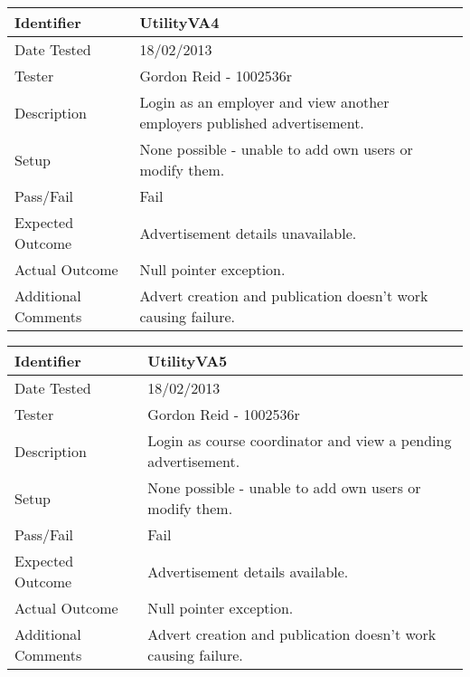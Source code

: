 \vspace{2em}

\begin{tabularx}{\textwidth}{|T|L|}
\hline
Identifier & UtilityVA4\\
\hline
Date Tested & 18/02/2013\\
\hline
Tester & Gordon Reid - 1002536r\\
\hline
Description & Login as an employer and view another employers published 
advertisement.\\
\hline
Setup & None possible - unable to add own users or modify them.\\
\hline
Pass/Fail & Fail\\
\hline
Expected Outcome & Advertisement details unavailable.\\
\hline
Actual Outcome & Null pointer exception.\\
\hline
Additional Comments & Advert creation and publication doesn't work causing
failure.\\
\hline
\end{tabularx}

\vspace{2em}

\begin{tabularx}{\textwidth}{|T|L|}
\hline
Identifier & UtilityVA5\\
\hline
Date Tested & 18/02/2013\\
\hline
Tester & Gordon Reid - 1002536r\\
\hline
Description & Login as course coordinator and view a pending advertisement.\\
\hline
Setup & None possible - unable to add own users or modify them.\\
\hline
Pass/Fail & Fail\\
\hline
Expected Outcome & Advertisement details available.\\
\hline
Actual Outcome & Null pointer exception.\\
\hline
Additional Comments & Advert creation and publication doesn't work causing
failure.\\
\hline
\end{tabularx}

\vspace{2em}


